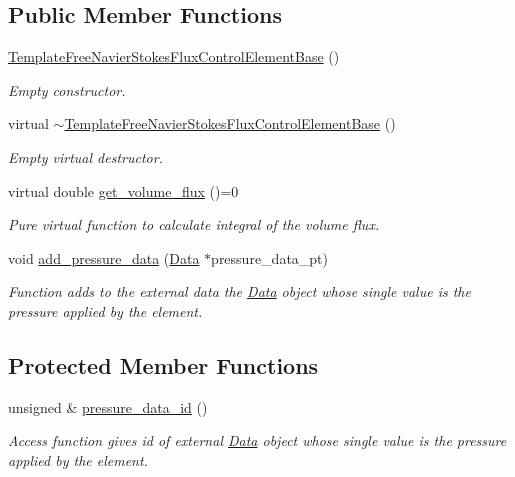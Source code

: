 \subsection*{Public Member Functions}
\begin{DoxyCompactItemize}
\item 
\hyperlink{classoomph_1_1TemplateFreeNavierStokesFluxControlElementBase_a40aa0d1bfde79887f6203474478acbb7}{Template\+Free\+Navier\+Stokes\+Flux\+Control\+Element\+Base} ()
\begin{DoxyCompactList}\small\item\em Empty constructor. \end{DoxyCompactList}\item 
virtual \hyperlink{classoomph_1_1TemplateFreeNavierStokesFluxControlElementBase_a42ebf77b9062c9eb84236e03f9f6ad3d}{$\sim$\+Template\+Free\+Navier\+Stokes\+Flux\+Control\+Element\+Base} ()
\begin{DoxyCompactList}\small\item\em Empty virtual destructor. \end{DoxyCompactList}\item 
virtual double \hyperlink{classoomph_1_1TemplateFreeNavierStokesFluxControlElementBase_a32bc6e84461a78a1637f05f0a2e2185a}{get\+\_\+volume\+\_\+flux} ()=0
\begin{DoxyCompactList}\small\item\em Pure virtual function to calculate integral of the volume flux. \end{DoxyCompactList}\item 
void \hyperlink{classoomph_1_1TemplateFreeNavierStokesFluxControlElementBase_a494ba420ccfba69e09cd6a6e7dc7225c}{add\+\_\+pressure\+\_\+data} (\hyperlink{classoomph_1_1Data}{Data} $\ast$pressure\+\_\+data\+\_\+pt)
\begin{DoxyCompactList}\small\item\em Function adds to the external data the \hyperlink{classoomph_1_1Data}{Data} object whose single value is the pressure applied by the element. \end{DoxyCompactList}\end{DoxyCompactItemize}
\subsection*{Protected Member Functions}
\begin{DoxyCompactItemize}
\item 
unsigned \& \hyperlink{classoomph_1_1TemplateFreeNavierStokesFluxControlElementBase_a9b36749e5dd3d4932609f6e050d5b343}{pressure\+\_\+data\+\_\+id} ()
\begin{DoxyCompactList}\small\item\em Access function gives id of external \hyperlink{classoomph_1_1Data}{Data} object whose single value is the pressure applied by the element. \end{DoxyCompactList}\end{DoxyCompactItemize}
